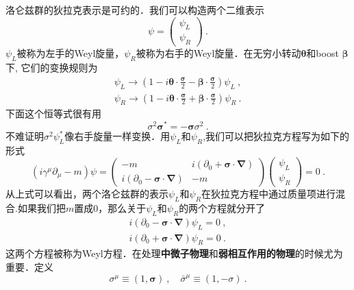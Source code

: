 
洛仑兹群的狄拉克表示是可约的．我们可以构造两个二维表示
\begin{equation}
\psi = \begin{pmatrix}
\psi_L \\
\psi_R
\end{pmatrix}~.
\end{equation}
$\psi_L$被称为左手的Weyl旋量，$\psi_R$被称为右手的Weyl旋量．在无穷小转动$\mathbf \theta$和boost $\mathbf \beta$下, 它们的变换规则为
\begin{align}
\psi_L \rightarrow (1-i \boldsymbol \theta \cdot \frac{\boldsymbol \sigma}{2} - \boldsymbol \beta \cdot \frac{\boldsymbol \sigma}{2})\psi_L ~, \\
\psi_R \rightarrow (1-i\boldsymbol \theta \cdot \frac{\boldsymbol \sigma}{2}+ \boldsymbol \beta \cdot \frac{\boldsymbol \sigma}{2})\psi_R ~.
\end{align}
下面这个恒等式很有用
\begin{equation}
\sigma^2\boldsymbol \sigma^* = - \boldsymbol \sigma \sigma^2~.
\end{equation}
不难证明$\sigma^2\psi^*_L$像右手旋量一样变换．用$\psi_L$和$\psi_R$,我们可以把狄拉克方程写为如下的形式
\begin{equation}
(i\gamma^\mu\partial_\mu - m)\psi = \begin{pmatrix}
- m & i (\partial_0+\boldsymbol \sigma \cdot \boldsymbol \nabla) \\
i(\partial_0-\boldsymbol\sigma\cdot \boldsymbol\nabla) & -m 
\end{pmatrix} \begin{pmatrix}
\psi_L \\ \psi_R 
\end{pmatrix}=0~.
\end{equation}
从上式可以看出，两个洛仑兹群的表示$\psi_L$和$\psi_R$在狄拉克方程中通过质量项进行混合.如果我们把$m$置成0，那么关于$\psi_L$和$\psi_R$的两个方程就分开了
\begin{align}
i(\partial_0 - \boldsymbol \sigma \cdot \boldsymbol \nabla) \psi_L = 0~, \\
i(\partial_0 + \boldsymbol \sigma \cdot \boldsymbol \nabla) \psi_R = 0~. 
\end{align}
这两个方程被称为Weyl方程．在处理\textbf{中微子物理}和\textbf{弱相互作用的物理}的时候尤为重要．定义
\begin{equation}
\sigma^\mu \equiv (1,\boldsymbol \sigma)~, \quad \bar \sigma^\mu \equiv (1,-\sigma)~.
\end{equation}
